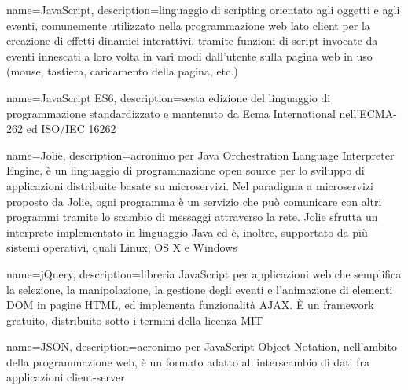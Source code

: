 

{
	name=JavaScript,
	description={linguaggio di scripting orientato agli oggetti e agli eventi, comunemente utilizzato nella programmazione web lato client per la creazione di effetti dinamici interattivi, tramite funzioni di script invocate da eventi innescati a loro volta in vari modi dall'utente sulla pagina web in uso (mouse, tastiera, caricamento della pagina, etc.)}
}

{
	name=JavaScript ES6,
	description={sesta edizione del linguaggio di programmazione standardizzato e mantenuto da Ecma International nell'ECMA-262 ed ISO/IEC 16262}
}


{
	name=Jolie,
	description={acronimo per Java Orchestration Language Interpreter Engine, è un linguaggio di programmazione open source per lo sviluppo di applicazioni distribuite basate su microservizi. Nel paradigma a microservizi proposto da Jolie, ogni programma è un servizio che può comunicare con altri programmi tramite lo scambio di messaggi attraverso la rete. Jolie sfrutta un interprete implementato in linguaggio Java ed è, inoltre, supportato da più sistemi operativi, quali Linux, OS X e Windows}
}

{
	name=jQuery,
	description={libreria JavaScript per applicazioni web che semplifica la selezione, la manipolazione, la gestione degli eventi e l'animazione di elementi DOM in pagine HTML, ed implementa funzionalità AJAX. \MakeUppercase{è} un framework gratuito, distribuito sotto i termini della licenza MIT}
}

{
	name=JSON,
	description={acronimo per JavaScript Object Notation, nell'ambito della programmazione web, è un formato adatto all'interscambio di dati fra applicazioni client-server}
}
